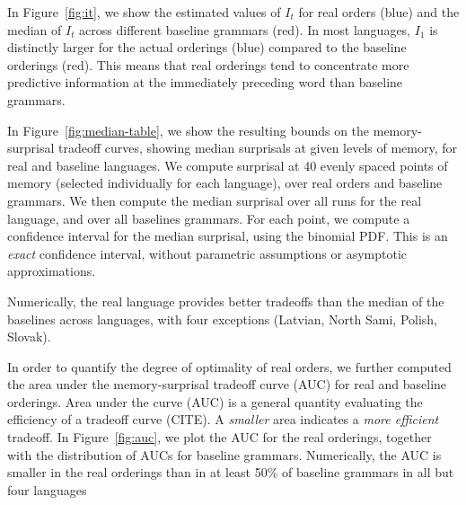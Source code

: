 


In Figure~\ref{fig:it}, we show the estimated values of $I_t$ for real orders (blue) and the median of $I_t$ across different baseline grammars (red).
In most languages, $I_1$ is distinctly larger for the actual orderings (blue) compared to the baseline orderings (red). This means that real orderings tend to concentrate more predictive information at the immediately preceding word than baseline grammars.

In Figure~\ref{fig:median-table}, we show the resulting bounds on the memory-surprisal tradeoff curves, showing median surprisals at given levels of memory, for real and baseline languages.
We compute surprisal at 40 evenly spaced points of memory (selected individually for each language), over real orders and baseline grammars.
We then compute the median surprisal over all runs for the real language, and over all baselines grammars.
For each point, we compute a confidence interval for the median surprisal, using the binomial PDF. 
This is an \emph{exact} confidence interval, without parametric assumptions or asymptotic approximations.

Numerically, the real language provides better tradeoffs than the median of the baselines across languages, with four exceptions (Latvian, North Sami, Polish, Slovak).


In order to quantify the degree of optimality of real orders, we further computed the area under the memory-surprisal tradeoff curve (AUC) for real and baseline orderings.
Area under the curve (AUC) is a general quantity evaluating the efficiency of a tradeoff curve (CITE).
A \emph{smaller} area indicates a \emph{more efficient} tradeoff.
In Figure~\ref{fig:auc}, we plot the AUC for the real orderings, together with the distribution of AUCs for baseline grammars.
Numerically, the AUC is smaller in the real orderings than in at least 50\% of baseline grammars in all but four languages


